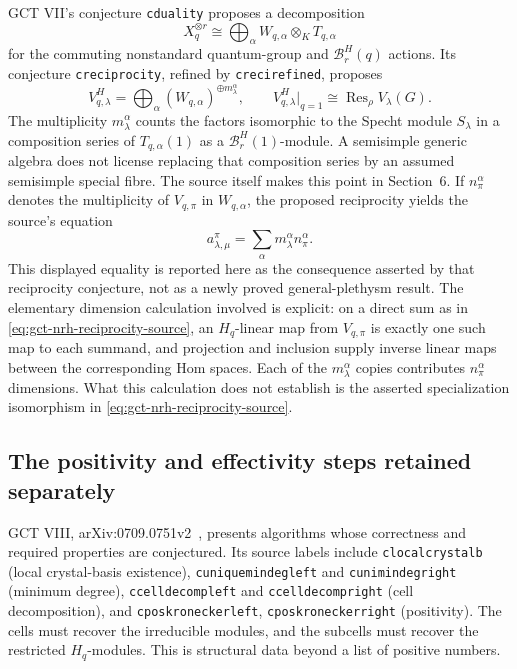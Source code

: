 GCT VII's conjecture \texttt{cduality} proposes a decomposition
\begin{equation}\label{eq:gct-nrh-duality-source}
 X_q^{\otimes r}
   \cong\bigoplus_\alpha W_{q,\alpha}\otimes_K T_{q,\alpha}
\end{equation}
for the commuting nonstandard quantum-group and
$\mathcal B_r^H(q)$ actions.  Its conjecture \texttt{creciprocity}, refined
by \texttt{crecirefined}, proposes
\begin{equation}\label{eq:gct-nrh-reciprocity-source}
 V_{q,\lambda}^{H}=\bigoplus_\alpha
                 (W_{q,\alpha})^{\oplus m_\lambda^\alpha},
 \qquad
 V_{q,\lambda}^{H}\big|_{q=1}
       \cong\operatorname{Res}_{\rho}V_\lambda(G).
\end{equation}
The multiplicity $m_\lambda^\alpha$ counts the factors isomorphic to the
Specht module $S_\lambda$ in a composition series of
$T_{q,\alpha}(1)$ as a $\mathcal B_r^H(1)$-module.  A semisimple generic
algebra does not license replacing that composition series by an assumed
semisimple special fibre.  The source itself makes this point in
Section~6.  If $n_\pi^\alpha$ denotes the multiplicity of $V_{q,\pi}$ in
$W_{q,\alpha}$, the proposed reciprocity yields the source's equation
\begin{equation}\label{eq:gct-nrh-multiplicities-source}
 a_{\lambda,\mu}^{\pi}
       =\sum_\alpha m_\lambda^\alpha n_\pi^\alpha.
\end{equation}
This displayed equality is reported here as the consequence asserted by
that reciprocity conjecture, not as a newly proved general-plethysm result.
The elementary dimension calculation involved is explicit: on a direct
sum as in \eqref{eq:gct-nrh-reciprocity-source}, an $H_q$-linear map from
$V_{q,\pi}$ is exactly one such map to each summand, and projection and
inclusion supply inverse linear maps between the corresponding Hom spaces.
Each of the $m_\lambda^\alpha$ copies contributes
$n_\pi^\alpha$ dimensions.  What this calculation does not establish is
the asserted specialization isomorphism in
\eqref{eq:gct-nrh-reciprocity-source}.

\subsection{The positivity and effectivity steps retained separately}

GCT VIII, arXiv:0709.0751v2~\cite{mulmuley2008gct8}, presents algorithms whose correctness and
required properties are conjectured.  Its source labels include
\texttt{clocalcrystalb} (local crystal-basis existence),
\texttt{cuniquemindegleft} and \texttt{cunimindegright} (minimum degree),
\texttt{ccelldecompleft} and \texttt{ccelldecompright} (cell decomposition),
and \texttt{cposkroneckerleft}, \texttt{cposkroneckerright} (positivity).
The cells must recover the irreducible modules, and the subcells must
recover the restricted $H_q$-modules.  This is structural data beyond a
list of positive numbers.

